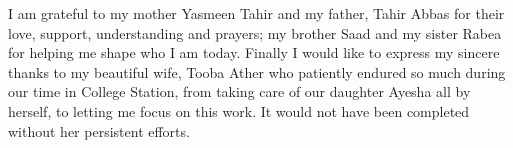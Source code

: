 I am grateful to my mother Yasmeen Tahir and my father, Tahir Abbas for their love, support, understanding and prayers; my brother Saad and my sister Rabea for helping me shape who I am today. Finally I would like to express my sincere thanks to my beautiful wife, Tooba Ather who patiently endured so much during our time in College Station, from taking care of our daughter Ayesha all by herself, to letting me focus on this work. It would not have been completed without her persistent efforts.

\pagebreak{}
